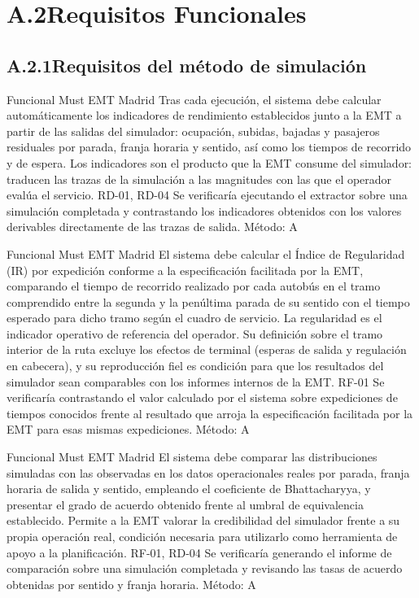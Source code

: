 \section*{A.2\quad Requisitos Funcionales}

\subsection*{A.2.1\quad Requisitos del método de simulación}

{Funcional}
{Must}
{EMT Madrid}
{Tras cada ejecución, el sistema debe calcular automáticamente los indicadores de rendimiento establecidos
junto a la EMT a partir de las salidas del simulador: ocupación, subidas, bajadas y pasajeros residuales por
parada, franja horaria y sentido, así como los tiempos de recorrido y de espera.}
{Los indicadores son el producto que la EMT consume del simulador: traducen las trazas de la simulación a las
magnitudes con las que el operador evalúa el servicio.}
{RD-01, RD-04}
{Se verificaría ejecutando el extractor sobre una simulación completada y contrastando los indicadores obtenidos
con los valores derivables directamente de las trazas de salida. Método: A}

{Funcional}
{Must}
{EMT Madrid}
{El sistema debe calcular el Índice de Regularidad (IR) por expedición conforme a la especificación facilitada
por la EMT, comparando el tiempo de recorrido realizado por cada autobús en el tramo comprendido entre la segunda
y la penúltima parada de su sentido con el tiempo esperado para dicho tramo según el cuadro de servicio.}
{La regularidad es el indicador operativo de referencia del operador. Su definición sobre el tramo interior de la
ruta excluye los efectos de terminal (esperas de salida y regulación en cabecera), y su reproducción fiel es
condición para que los resultados del simulador sean comparables con los informes internos de la EMT.}
{RF-01}
{Se verificaría contrastando el valor calculado por el sistema sobre expediciones de tiempos conocidos frente al
resultado que arroja la especificación facilitada por la EMT para esas mismas expediciones. Método: A}

{Funcional}
{Must}
{EMT Madrid}
{El sistema debe comparar las distribuciones simuladas con las observadas en los datos operacionales reales por
parada, franja horaria de salida y sentido, empleando el coeficiente de Bhattacharyya, y presentar el grado de
acuerdo obtenido frente al umbral de equivalencia establecido.}
{Permite a la EMT valorar la credibilidad del simulador frente a su propia operación real, condición necesaria
para utilizarlo como herramienta de apoyo a la planificación.}
{RF-01, RD-04}
{Se verificaría generando el informe de comparación sobre una simulación completada y revisando las tasas de
acuerdo obtenidas por sentido y franja horaria. Método: A}

